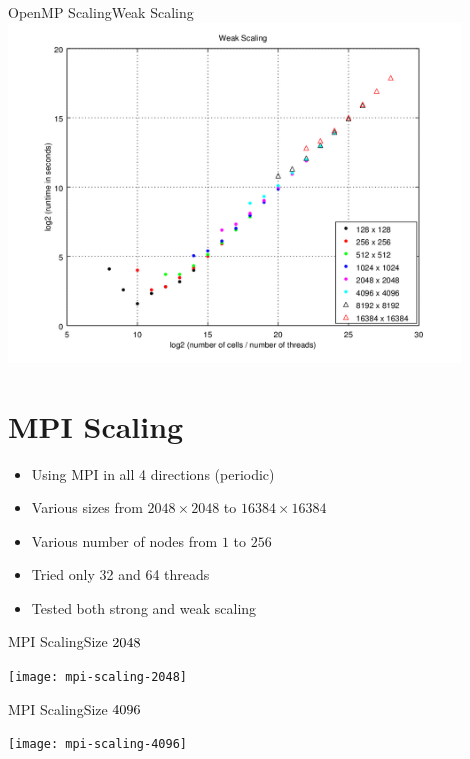 \documentclass{beamer}
\begin{document}
\begin{frame}{OpenMP Scaling}{Weak Scaling}
    \includegraphics[width=0.9\textwidth]{weak-scaling}
\end{frame}

\section{MPI Scaling}

\begin{frame}
    \begin{itemize}
        \item Using MPI in all 4 directions (periodic)
        \item Various sizes from $2048 \times 2048$ to $16384 \times 16384$
        \item Various number of nodes from $1$ to $256$
        \item Tried only 32 and 64 threads
        \item Tested both strong and weak scaling
    \end{itemize}
\end{frame}

\begin{frame}{MPI Scaling}{Size $2048 \time 2048$}
    \begin{center}
        \texttt{[image: mpi-scaling-2048]}
    \end{center}
\end{frame}

\begin{frame}{MPI Scaling}{Size $4096 \time 4096$}
    \begin{center}
        \texttt{[image: mpi-scaling-4096]}
    \end{center}
\end{frame}
\end{document}
